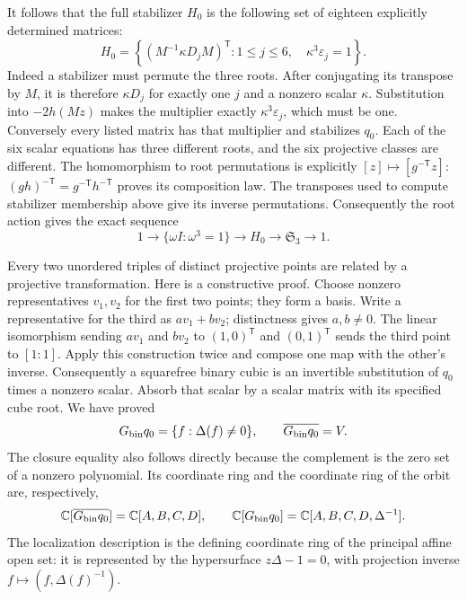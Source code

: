 It follows that the full stabilizer $H_0$ is the following set of
eighteen explicitly determined matrices:
\begin{equation}\label{eq:invariant-stab}
 H_0=
 \left\{\left(M^{-1}\kappa D_jM\right)^{\mathsf T}:
      1\le j\le6,\quad\kappa^3\varepsilon_j=1\right\}.
\end{equation}
Indeed a stabilizer must permute the three roots. After conjugating
its transpose by $M$, it is therefore $\kappa D_j$ for exactly one
$j$ and a nonzero scalar $\kappa$. Substitution into $-2h(Mz)$ makes
the multiplier exactly $\kappa^3\varepsilon_j$, which must be one.
Conversely every listed matrix has that multiplier and stabilizes
$q_0$. Each of the six scalar equations has three different roots,
and the six projective classes are different. The homomorphism to
root permutations is explicitly $[z]\mapsto[g^{-\mathsf T}z]$:
$(gh)^{-\mathsf T}=g^{-\mathsf T}h^{-\mathsf T}$ proves its composition
law. The transposes used to compute stabilizer membership above
give its inverse permutations. Consequently the root action gives
the exact sequence
\[
 1\longrightarrow\{\omega I:\omega^3=1\}
 \longrightarrow H_0\longrightarrow\mathfrak S_3\longrightarrow1.
\]

Every two unordered triples of distinct projective points are related
by a projective transformation. Here is a constructive proof. Choose
nonzero representatives $v_1,v_2$ for the first two points; they form
a basis. Write a representative for the third as $av_1+bv_2$;
distinctness gives $a,b\ne0$. The linear isomorphism sending
$av_1$ and $bv_2$ to $(1,0)^{\mathsf T}$ and $(0,1)^{\mathsf T}$
sends the third point to $[1:1]$. Apply this construction twice and
compose one map with the other's inverse. Consequently a squarefree
binary cubic is an invertible substitution of $q_0$ times a nonzero
scalar. Absorb that scalar by a scalar matrix with its specified
cube root. We have proved
\begin{equation}\label{eq:invariant-open-orbit}
 G_{\rm bin}q_0=\{f:\Delta(f)\ne0\},\qquad
 \overline{G_{\rm bin}q_0}=V.
\end{equation}
The closure equality also follows directly because the complement
is the zero set of a nonzero polynomial. Its coordinate ring and
the coordinate ring of the orbit are, respectively,
\[
 \mathbb C[\overline{G_{\rm bin}q_0}]=\mathbb C[A,B,C,D],
 \qquad
 \mathbb C[G_{\rm bin}q_0]=\mathbb C[A,B,C,D,\Delta^{-1}].
\]
The localization description is the defining coordinate ring of the
principal affine open set: it is represented by the hypersurface
$z\Delta-1=0$, with projection inverse $f\mapsto(f,\Delta(f)^{-1})$.


